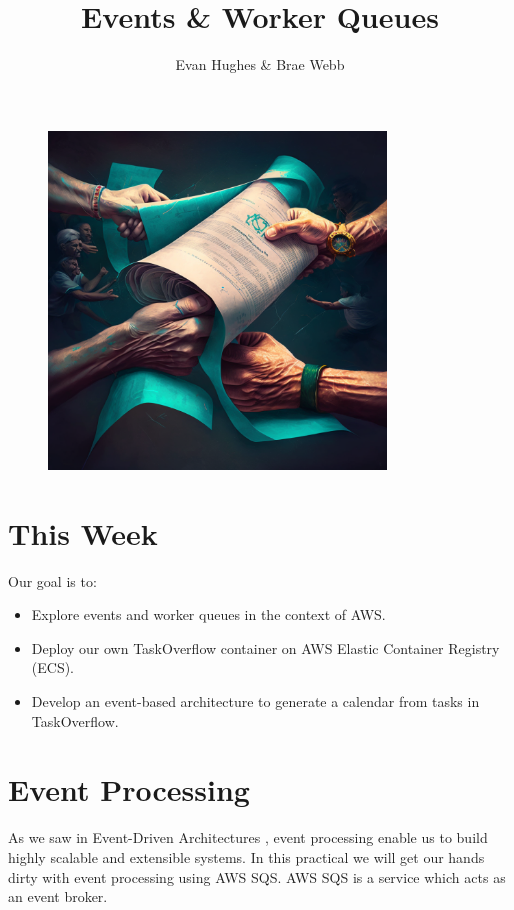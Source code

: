 \documentclass{csse4400}
\title{Events \& Worker Queues}
\author{Evan Hughes \& Brae Webb}
\date{\week[practical]{7}}
\begin{document}
\maketitle

\begin{figure}[ht]
    \centering
    \includegraphics[width=0.8\textwidth]{images/event-driven}
\end{figure}

\section{This Week}
Our goal is to:
\begin{itemize}
    \item Explore events and worker queues in the context of AWS.
    \item Deploy our own TaskOverflow container on AWS Elastic Container Registry (ECS).
    \item Develop an event-based architecture to generate a calendar from tasks in TaskOverflow.
\end{itemize}

\section{Event Processing}

As we saw in Event-Driven Architectures \cite{events-notes},
event processing enable us to build highly scalable and extensible systems.
In this practical we will get our hands dirty with event processing using AWS SQS.
AWS SQS is a service which acts as an event broker.
\end{document}
